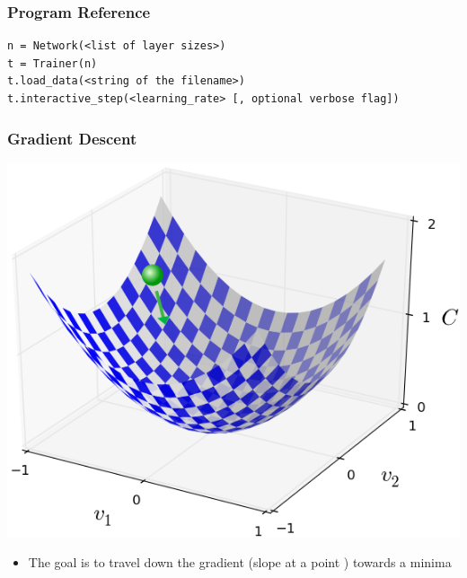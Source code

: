 \documentclass{beamer}
\makeatletter
\newcommand{\verbatimfont}[1]{\renewcommand{\verbatim@font}{\ttfamily#1}}
\makeatother
\begin{document}
\begin{frame}[fragile]
    \frametitle{Program Reference}
    \begin{example}
        \verbatimfont{\scriptsize}
        \begin{verbatim}
n = Network(<list of layer sizes>)
t = Trainer(n)
t.load_data(<string of the filename>)
t.interactive_step(<learning_rate> [, optional verbose flag])
        \end{verbatim}
    \end{example}
\end{frame}
\begin{frame}
    \frametitle{Gradient Descent}
    \begin{center}
        \includegraphics[scale=.15]{descent}
    \end{center}
    \begin{itemize}
        \item The goal is to travel down the gradient (slope at a point ) towards a minima
    \end{itemize}
\end{frame}
\end{document}
